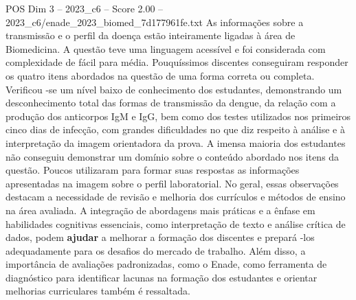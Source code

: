 \begin{textsample}{POS Dim 3 – 2023\_c6 – Score 2.00 – 2023\_c6/enade\_2023\_biomed\_7d177961fe.txt}
As informações sobre a transmissão e o perfil da doença estão inteiramente ligadas à área de Biomedicina.
A questão teve uma linguagem acessível e foi considerada com complexidade de fácil para média.
Pouquíssimos discentes conseguiram responder os quatro itens abordados na questão de uma forma correta ou completa.
Verificou -se um nível baixo de conhecimento dos estudantes, demonstrando um desconhecimento total das formas de transmissão da dengue, da relação com a produção dos anticorpos IgM e IgG, bem como dos testes utilizados nos primeiros cinco dias de infecção, com grandes dificuldades no que diz respeito à análise e à interpretação da imagem orientadora da prova.
A imensa maioria dos estudantes não conseguiu demonstrar um domínio sobre o conteúdo abordado nos itens da questão.
Poucos utilizaram para formar suas respostas as informações apresentadas na imagem sobre o perfil laboratorial.
No geral, essas observações destacam a necessidade de revisão e melhoria dos currículos e métodos de ensino na área avaliada.
A integração de abordagens mais práticas e a ênfase em habilidades cognitivas essenciais, como interpretação de texto e análise crítica de dados, podem \textbf{ajudar} a melhorar a formação dos discentes e prepará -los adequadamente para os desafios do mercado de trabalho.
Além disso, a importância de avaliações padronizadas, como o Enade, como ferramenta de diagnóstico para identificar lacunas na formação dos estudantes e orientar melhorias curriculares também é ressaltada.

\end{textsample}
